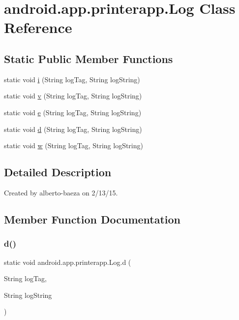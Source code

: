 \hypertarget{classandroid_1_1app_1_1printerapp_1_1_log}{}\section{android.\+app.\+printerapp.\+Log Class Reference}
\label{classandroid_1_1app_1_1printerapp_1_1_log}
\subsection*{Static Public Member Functions}
\begin{DoxyCompactItemize}
\item 
static void \hyperlink{classandroid_1_1app_1_1printerapp_1_1_log_a40cea39be49020daaf51854a244e11f6}{i} (String log\+Tag, String log\+String)
\item 
static void \hyperlink{classandroid_1_1app_1_1printerapp_1_1_log_ad8ff68f084cfe388ce63cf452dda72fd}{v} (String log\+Tag, String log\+String)
\item 
static void \hyperlink{classandroid_1_1app_1_1printerapp_1_1_log_a0acfd50f97b21b75969971556a641d9c}{e} (String log\+Tag, String log\+String)
\item 
static void \hyperlink{classandroid_1_1app_1_1printerapp_1_1_log_a8f406a24aa27231dfa1a8edbbbba4a46}{d} (String log\+Tag, String log\+String)
\item 
static void \hyperlink{classandroid_1_1app_1_1printerapp_1_1_log_a53da8be931dc909129a9bc7d530ae0ed}{w} (String log\+Tag, String log\+String)
\end{DoxyCompactItemize}


\subsection{Detailed Description}
Created by alberto-\/baeza on 2/13/15. 

\subsection{Member Function Documentation}
\mbox{\label{classandroid_1_1app_1_1printerapp_1_1_log_a8f406a24aa27231dfa1a8edbbbba4a46}} 
\subsubsection{\texorpdfstring{d()}{d()}}
{\footnotesize\ttfamily static void android.\+app.\+printerapp.\+Log.\+d (\begin{DoxyParamCaption}\item[{String}]{log\+Tag,  }\item[{String}]{log\+String }\end{DoxyParamCaption})\hspace{0.3cm}{\ttfamily [static]}}

